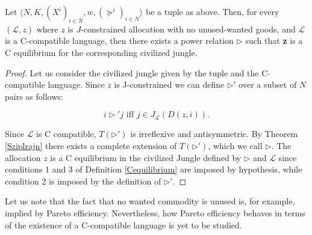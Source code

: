 \begin{theorem}
    Let $\langle N,K,(X^i)_{i\in N}, w, (\succeq^i)_{i\in N} \rangle$ be a tuple as above. Then, for every $(\mathcal{L},z)$ where $z$ is $J$-constrained allocation with no unused-wanted goods, and $\mathcal{L}$ is a C-compatible language, then there exists a power relation $\triangleright$ such that \textbf{z} is a C equilibrium for the corresponding civilized jungle.
    \begin{proof}
        Let us consider the civilized jungle given by the tuple and the C-compatible language. Since $z$ is J-constrained we can define $\triangleright'$ over a subset of $N$ pairs as follows:

        \[i\triangleright' j \text{ iff } j\in J_{\mathcal{L}}(D(z,i)).\]

        Since $\mathcal{L}$ is C compatible, $T(\triangleright')$ is irreflexive and antisymmetric. By Theorem \ref{Sziplrajn} there exists a complete extension of $T(\triangleright')$, which we call $\triangleright$. The allocation $z$ is a C equilibrium in the civilized Jungle defined by $\triangleright$ and $\mathcal{L}$ since conditions 1 and 3 of Definition \ref{Cequilibrium} are imposed by hypothesis, while condition 2 is imposed by the definition of $\triangleright'$.
        
        

    \end{proof}
\end{theorem}

Let us note that the fact that no wanted commodity is unused is, for example, implied by Pareto efficiency. Nevertheless, how Pareto efficiency behaves in terms of the existence of a C-compatible language is yet to be studied. 


\vspace{3mm}

